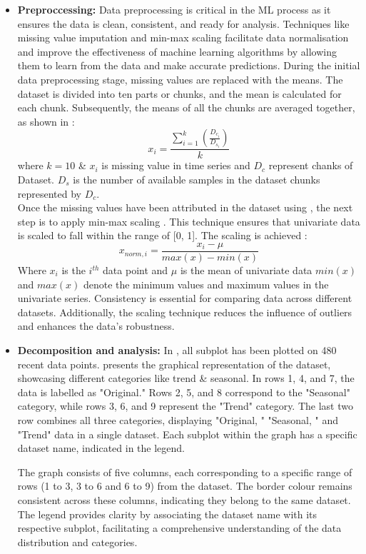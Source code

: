 \documentclass[a4paper, fleqn]{cas-sc}
\theoremstyle{definition}
\theoremstyle{remark}
\begin{document}
\begin{itemize}
\item \textbf{Preproccessing: }Data preprocessing is critical in the ML process as it ensures the data is clean,  consistent,  and ready for analysis. Techniques like missing value imputation and min-max scaling facilitate data normalisation and improve the effectiveness of machine learning algorithms by allowing them to learn from the data and make accurate predictions.
During the initial data preprocessing stage,  missing values are replaced with the means. The dataset is divided into ten parts or chunks,  and the mean is calculated for each chunk. Subsequently,  the means of all the chunks are averaged together,  as shown in :
\begin{equation} \label{equ: mean}
        x_i=\frac{\sum_{i=1}^{k} \left(\frac{D_{c_{i}}}{D_{s_{i}}} \right)}{k}
\end{equation}
 where $k=10$ \& $x_i$ is missing value in time series and $D_c$ represent chanks of Dataset. $D_s$ is the number of available samples in the dataset chunks represented by $D_c$. \\
Once the missing values have been attributed in the dataset using , the next step is to apply min-max scaling . This technique ensures that univariate data is scaled to fall within the range of [0, 1]. The scaling is achieved : 
\begin{equation}
        x_{norm,  i}=\frac{x_i - \mu}{max(x)-min(x)}
        \label{equ: minmax}
    \end{equation}
Where $x_i$ is the $i^{th}$ data point and $\mu$ is the mean of univariate data $min(x)$  and $max(x)$ denote the minimum values and maximum values in the univariate series. Consistency is essential for comparing data across different datasets. Additionally,  the scaling technique reduces the influence of outliers and enhances the data's robustness.
\item
\textbf{Decomposition and analysis: }
In , all subplot has been plotted on 480 recent data points.  presents the graphical representation of the dataset,  showcasing different categories like trend \&  seasonal. In rows 1,  4,  and 7,  the data is labelled as "Original." Rows 2,  5,  and 8 correspond to the "Seasonal" category,  while rows 3,  6,  and 9 represent the "Trend" category. The last two row combines all three categories,  displaying "Original, " "Seasonal, " and "Trend" data in a single dataset. Each subplot within the graph has a specific dataset name,  indicated in the legend.
\par The graph consists of five columns,  each corresponding to a specific range of rows (1 to 3,  3 to 6 and 6 to 9) from the dataset. The border colour remains consistent across these columns,  indicating they belong to the same dataset. The legend provides clarity by associating the dataset name with its respective subplot,  facilitating a comprehensive understanding of the data distribution and categories.


\end{itemize}
\end{document}
